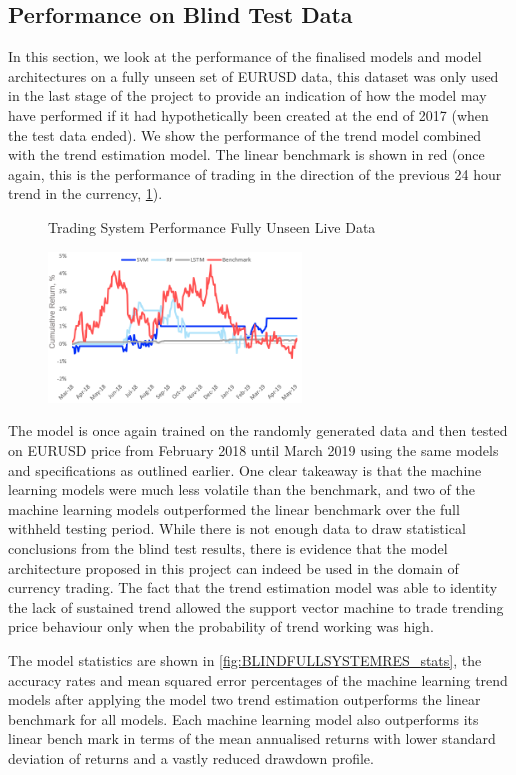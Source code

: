 \documentclass[11pt]{article}
\begin{document}
\subsection{Performance on Blind Test Data}
In this section, we look at the performance of the finalised models and model architectures on a fully unseen set of EURUSD data, this dataset was only used in the last stage of the project to provide an indication of how the model may have performed if it had hypothetically been created at the end of 2017 (when the test data ended). We show the performance of the trend model combined with the trend estimation model. The linear benchmark is shown in red (once again, this is the performance of trading in the direction of the previous 24 hour trend in the currency, \ref{fig:BLINDFULLSYSTEMRES}).
\begin{figure}[h]
    \centering
	\caption{Trading System Performance Fully Unseen Live Data}    
	\includegraphics[width=0.6\textwidth]{BLINDFULLSYSTEMRES}
    \label{fig:BLINDFULLSYSTEMRES}
     \caption*{}
\end{figure}
The model is once again trained on the randomly generated data and then tested on EURUSD price from February 2018 until March 2019 using the same models and specifications as outlined earlier. 
 One clear takeaway is that the machine learning models were much less volatile than the benchmark, and two of the machine learning models outperformed the linear benchmark over the full withheld testing period. While there is not enough data to draw statistical conclusions from the blind test results, there is evidence that the model architecture proposed in this project can indeed be used in the domain of currency trading. The fact that the trend estimation model was able to identity the lack of sustained trend allowed the support vector machine to trade trending price behaviour only when the probability of trend working was high.

The model statistics are shown in \ref{fig:BLINDFULLSYSTEMRES_stats}, the accuracy rates  and mean squared error percentages of the machine learning trend models after applying the model two trend estimation outperforms the linear benchmark for all models. Each machine learning model also outperforms its linear bench mark in terms of the mean annualised returns with lower standard deviation of returns and a vastly reduced drawdown profile.
\end{document}
